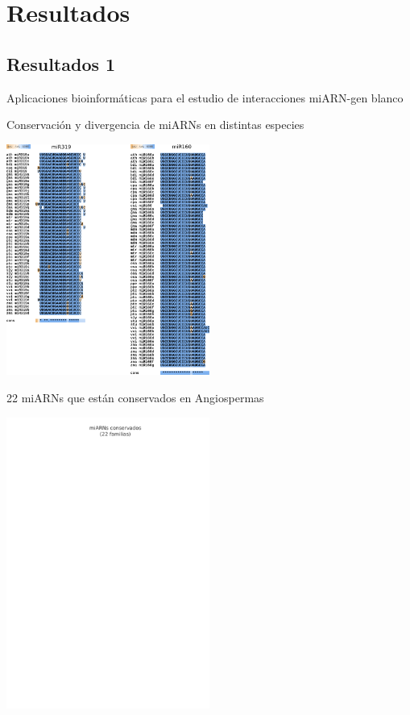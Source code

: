\documentclass{beamer}
\begin{document}
\section{Resultados}

\subsection{Resultados 1}

\begin{frame}{Aplicaciones bioinformáticas para el estudio de interacciones miARN-gen blanco}
\end{frame}

\begin{frame}{Conservación y divergencia de miARNs en distintas especies}
	\begin{center}
		\includegraphics[width=0.5\textwidth]{img/variabilidad_maduro.png}
	\end{center}
\end{frame}

\begin{frame}{22 miARNs que están conservados en Angiospermas}
	\begin{center}
		\includegraphics[width=0.5\textwidth]{img/NAR_fig1_01.png}
	\end{center}
\end{frame}
\end{document}
